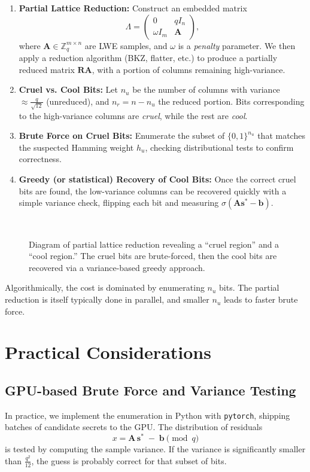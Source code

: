 \documentclass[11pt]{article}
\begin{document}
\begin{enumerate}
  \item \textbf{Partial Lattice Reduction:}
    Construct an embedded matrix
    \[
      \Lambda =
      \begin{pmatrix}
        0 & q I_n \\
        \omega I_m & \mathbf{A}
      \end{pmatrix},
    \]
    where $\mathbf{A} \in \mathbb{Z}_q^{m \times n}$ are LWE samples, and $\omega$ is a \emph{penalty} parameter. We then apply a reduction algorithm (BKZ, flatter, etc.) to produce a partially reduced matrix $\mathbf{R}\mathbf{A}$, with a portion of columns remaining high-variance.
  \item \textbf{Cruel vs. Cool Bits:}
    Let $n_u$ be the number of columns with variance $\approx \frac{q}{\sqrt{12}}$ (unreduced), and $n_r = n - n_u$ the reduced portion. Bits corresponding to the high-variance columns are \emph{cruel}, while the rest are \emph{cool}.
  \item \textbf{Brute Force on Cruel Bits:}
    Enumerate the subset of $\{0,1\}^{n_u}$ that matches the suspected Hamming weight $h_u$, checking distributional tests to confirm correctness.
  \item \textbf{Greedy (or statistical) Recovery of Cool Bits:}
    Once the correct cruel bits are found, the low-variance columns can be recovered quickly with a simple variance check, flipping each bit and measuring $\sigma(\mathbf{A}\mathbf{s}^* - \mathbf{b})$.
\end{enumerate}

\begin{figure}[ht]
  \centering
  \
  \caption{Diagram of partial lattice reduction revealing a ``cruel region'' and a ``cool region.'' The cruel bits are brute-forced, then the cool bits are recovered via a variance-based greedy approach.}
  \label{fig:attack_overview}
\end{figure}

\noindent
Algorithmically, the cost is dominated by enumerating $n_u$ bits. The partial reduction is itself typically done in parallel, and smaller $n_u$ leads to faster brute force.

\section{Practical Considerations}
\label{sec:practical}
\subsection{GPU-based Brute Force and Variance Testing}
In practice, we implement the enumeration in Python with \texttt{pytorch}, shipping batches of candidate secrets to the GPU. The distribution of residuals
\[
x = \mathbf{A}\,\mathbf{s}^* \;-\; \mathbf{b} \pmod{q}
\]
is tested by computing the sample variance. If the variance is significantly smaller than $\frac{q^2}{12}$, the guess is probably correct for that subset of bits.
\end{document}
